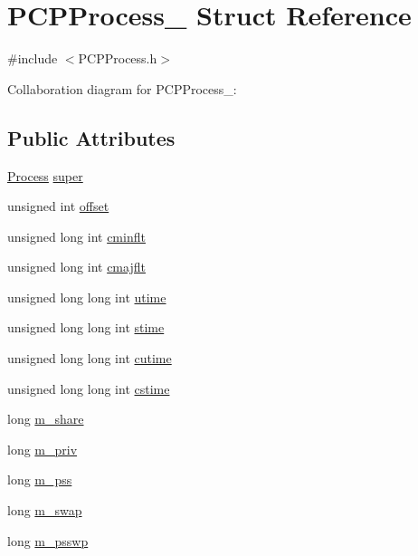 \hypertarget{structPCPProcess__}{}\section{P\+C\+P\+Process\+\_\+ Struct Reference}
\label{structPCPProcess__}


{\ttfamily \#include $<$P\+C\+P\+Process.\+h$>$}



Collaboration diagram for P\+C\+P\+Process\+\_\+\+:
\subsection*{Public Attributes}
\begin{DoxyCompactItemize}
\item 
\hyperlink{Process_8h_a20673e8fa40981a168bf0e196c4cef3b}{Process} \hyperlink{structPCPProcess___a972af1f4a96d6ac602c960bc8f09e9cb}{super}
\item 
unsigned int \hyperlink{structPCPProcess___ab2767b4c059c0e65c1ad7cdd1f43d2fb}{offset}
\item 
unsigned long int \hyperlink{structPCPProcess___a7a1b655d442c7eaea6477d35b2e3cfa5}{cminflt}
\item 
unsigned long int \hyperlink{structPCPProcess___a802f4755904374259f12ca659fad1fa6}{cmajflt}
\item 
unsigned long long int \hyperlink{structPCPProcess___ad1ea83bfdd17df3e7caa7300fe6f9d11}{utime}
\item 
unsigned long long int \hyperlink{structPCPProcess___a634ed7e86e8d4ced27c10eeb50f8463b}{stime}
\item 
unsigned long long int \hyperlink{structPCPProcess___ab616ec78a2bfc07e27f30701736018d8}{cutime}
\item 
unsigned long long int \hyperlink{structPCPProcess___acb3a4500661949f928bc7f5985c264b7}{cstime}
\item 
long \hyperlink{structPCPProcess___a0d13250398101b859ffa2d55406e031a}{m\+\_\+share}
\item 
long \hyperlink{structPCPProcess___afb5837e39fe053096eaf9abcd6f5bce0}{m\+\_\+priv}
\item 
long \hyperlink{structPCPProcess___ae23ff82054622d3f090ee092cc773d2b}{m\+\_\+pss}
\item 
long \hyperlink{structPCPProcess___abd1babdef0e9dc00cba878aa4ac87446}{m\+\_\+swap}
\item 
long \hyperlink{structPCPProcess___aa2d15a352fd6e7ae254509a011a25d2b}{m\+\_\+psswp}

\end{DoxyCompactItemize}
